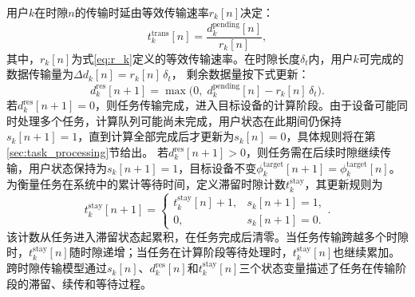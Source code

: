 用户$k$在时隙$n$的传输时延由等效传输速率$r_k[n]$决定：
\begin{equation}\label{eq:t_trans}
t_k^{\text{trans}}[n] = \frac{d_{k}^{\text{pending}}[n]}{r_k[n]},
\end{equation}
其中，$r_k[n]$为式\eqref{eq:r_k}定义的等效传输速率。在时隙长度$\delta_t$内，用户$k$可完成的数据传输量为$\Delta d_{k}[n] = r_k[n]\,\delta_t$，
剩余数据量按下式更新：
\begin{equation}\label{eq:residual_data}
d_{k}^{\text{res}}[n+1] = \max\!\big(0,\; d_{k}^{\text{pending}}[n] - r_k[n]\,\delta_t\big).
\end{equation}
若$d_{k}^{\text{res}}[n+1]=0$，则任务传输完成，进入目标设备的计算阶段。由于设备可能同时处理多个任务，计算队列可能尚未完成，用户状态在此期间仍保持$s_k[n+1]=1$，直到计算全部完成后才更新为$s_k[n]=0$，具体规则将在第\ref{sec:task_processing}节给出。
若$d_{k}^{\text{res}}[n+1]>0$，则任务需在后续时隙继续传输，用户状态保持为$s_{k}[n+1]=1$，目标设备不变$\phi_{k}^{\text{target}}[n+1]=\phi_{k}^{\text{target}}[n]$。
为衡量任务在系统中的累计等待时间，定义滞留时隙计数$t_k^{\text{stay}}$，其更新规则为
\begin{equation}\label{eq:t_stay}
t_k^{\text{stay}}[n+1]=
\begin{cases}
t_k^{\text{stay}}[n]+1, & s_k[n+1]=1,\\[3pt]
0, & s_k[n+1]=0.
\end{cases}.
\end{equation}
该计数从任务进入滞留状态起累积，在任务完成后清零。当任务传输跨越多个时隙时，$t_k^{\text{stay}}[n]$随时隙递增；当任务在计算阶段等待处理时，$t_k^{\text{stay}}[n]$也继续累加。跨时隙传输模型通过$s_k[n]$、$d_k^{\text{res}}[n]$和$t_k^{\text{stay}}[n]$三个状态变量描述了任务在传输阶段的滞留、续传和等待过程。


